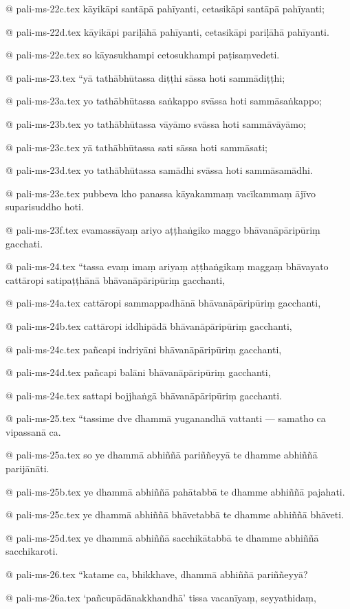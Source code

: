 @ pali-ms-22c.tex
kāyikāpi santāpā pahīyanti, cetasikāpi santāpā pahīyanti;

@ pali-ms-22d.tex
kāyikāpi pariḷāhā pahīyanti, cetasikāpi pariḷāhā pahīyanti.

@ pali-ms-22e.tex
so kāyasukhampi cetosukhampi paṭisaṃvedeti.

@ pali-ms-23.tex
“yā tathābhūtassa diṭṭhi sāssa hoti sammādiṭṭhi;

@ pali-ms-23a.tex
yo tathābhūtassa saṅkappo svāssa hoti sammāsaṅkappo;

@ pali-ms-23b.tex
yo tathābhūtassa vāyāmo svāssa hoti sammāvāyāmo;

@ pali-ms-23c.tex
yā tathābhūtassa sati sāssa hoti sammāsati;

@ pali-ms-23d.tex
yo tathābhūtassa samādhi svāssa hoti sammāsamādhi.

@ pali-ms-23e.tex
pubbeva kho panassa kāyakammaṃ vacīkammaṃ ājīvo suparisuddho hoti.

@ pali-ms-23f.tex
evamassāyaṃ ariyo aṭṭhaṅgiko maggo bhāvanāpāripūriṃ gacchati.

@ pali-ms-24.tex
“tassa evaṃ imaṃ ariyaṃ aṭṭhaṅgikaṃ maggaṃ bhāvayato cattāropi satipaṭṭhānā bhāvanāpāripūriṃ gacchanti,

@ pali-ms-24a.tex
cattāropi sammappadhānā bhāvanāpāripūriṃ gacchanti,

@ pali-ms-24b.tex
cattāropi iddhipādā bhāvanāpāripūriṃ gacchanti,

@ pali-ms-24c.tex
pañcapi indriyāni bhāvanāpāripūriṃ gacchanti,

@ pali-ms-24d.tex
pañcapi balāni bhāvanāpāripūriṃ gacchanti,

@ pali-ms-24e.tex
sattapi bojjhaṅgā bhāvanāpāripūriṃ gacchanti.

@ pali-ms-25.tex
“tassime dve dhammā yuganandhā vattanti — samatho ca vipassanā ca.

@ pali-ms-25a.tex
so ye dhammā abhiññā pariññeyyā te dhamme abhiññā parijānāti.

@ pali-ms-25b.tex
ye dhammā abhiññā pahātabbā te dhamme abhiññā pajahati.

@ pali-ms-25c.tex
ye dhammā abhiññā bhāvetabbā te dhamme abhiññā bhāveti.

@ pali-ms-25d.tex
ye dhammā abhiññā sacchikātabbā te dhamme abhiññā sacchikaroti.

@ pali-ms-26.tex
“katame ca, bhikkhave, dhammā abhiññā pariññeyyā?

@ pali-ms-26a.tex
‘pañcupādānakkhandhā’ tissa vacanīyaṃ, seyyathidaṃ,

